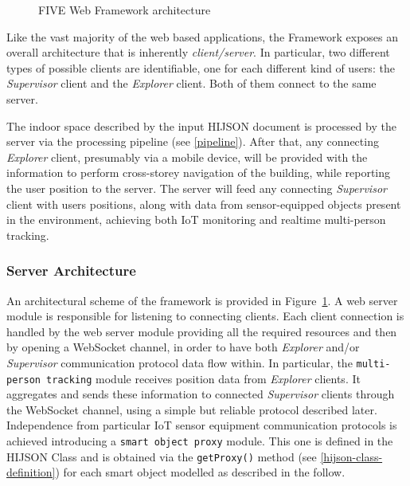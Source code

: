 \begin{figure}[htb]
\centering
{}
\caption{FIVE Web Framework architecture}
\label{fig:architecture}
\end{figure}

Like the vast majority of the web based applications, the Framework exposes an
overall architecture that is inherently \emph{client/server}. In particular,
two different types of possible clients are identifiable, one for each different 
kind of users: the \emph{Supervisor} client and the \emph{Explorer} client. 
Both of them connect to the same server.

The indoor space described by the input HIJSON document is processed by the
server via the processing pipeline (see \ref{pipeline}). After that, any
connecting \emph{Explorer} client, presumably via a mobile device, will be
provided with the information to perform cross-storey navigation of the
building, while reporting the user position to the server. The server will
feed any connecting \emph{Supervisor} client with users positions, along with
data from sensor-equipped  objects present in the environment, achieving both
IoT monitoring and realtime multi-person tracking.

\subsubsection{Server Architecture}\label{server-architecture}

An architectural scheme of the framework is provided in
Figure~\ref{fig:architecture}. A web server module is responsible for
listening to connecting clients. Each client connection is handled by the web
server module providing all the required resources and then by opening a
WebSocket channel, in order to have both \emph{Explorer} and/or
\emph{Supervisor} communication protocol data flow within. In particular, the
\texttt{multi-person\ tracking} module receives position data from
\emph{Explorer} clients. It aggregates and sends these information to
connected \emph{Supervisor} clients through the WebSocket channel, using a
simple but reliable protocol described later. Independence from particular IoT
sensor equipment communication protocols is achieved introducing a
\texttt{smart\ object\ proxy} module. This one is defined in the HIJSON Class
and is obtained via the \texttt{getProxy()} method (see \ref{hijson-class-definition}) 
for each smart object modelled as described in the follow.

